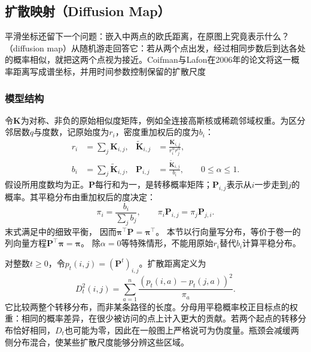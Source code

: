 \subsection{扩散映射（Diffusion Map）}
\label{sec:dim-diffusion}

平滑坐标还留下一个问题：嵌入中两点的欧氏距离，在原图上究竟表示什么？（diffusion map）从随机游走回答它：若从两个点出发，经过相同步数后到达各处的概率相似，就把这两个点视为接近。Coifman与Lafon在2006年的论文将这一概率距离写成谱坐标，并用时间参数控制保留的扩散尺度

\subsubsection{模型结构}

令$\bm{K}$为对称、非负的原始相似度矩阵，例如全连接高斯核或稀疏邻域权重。为区分邻居数$q$与度数，记原始度为$r_i$，密度重加权后的度为$b_i$：
\begin{equation}
  \label{eq:dim-diffusion-normalization}
  \begin{aligned}
    r_i&=\sum_j\bm{K}_{i,j},&
    \widetilde{\bm{K}}_{i,j}
      &=\frac{\bm{K}_{i,j}}{r_i^\alpha r_j^\alpha},\\
    b_i&=\sum_j\widetilde{\bm{K}}_{i,j},&
    \bm{P}_{i,j}&=\frac{\widetilde{\bm{K}}_{i,j}}{b_i},
    \qquad 0\leq\alpha\leq1.
  \end{aligned}
\end{equation}
假设所用度数均为正。$\bm{P}$每行和为一，是转移概率矩阵；$\bm{P}_{i,j}$表示从$i$一步走到$j$的概率。其平稳分布由重加权后的度决定：
\begin{equation}
  \label{eq:dim-diffusion-stationary}
  \pi_i=\frac{b_i}{\sum_j b_j},
  \qquad
  \pi_i\bm{P}_{i,j}=\pi_j\bm{P}_{j,i}.
\end{equation}
末式满足中的细致平衡，
因而$\bm{\pi}^{\top}\bm{P}=\bm{\pi}^{\top}$。
本节以行向量写分布，等价于卷一的列向量方程$\bm P^\top\bm\pi=\bm\pi$。
除$\alpha=0$等特殊情形，不能用原始$r_i$替代$b_i$计算平稳分布。

对整数$t\geq0$，令$p_t(i,j)=(\bm{P}^t)_{i,j}$。扩散距离定义为
\begin{equation}
  \label{eq:dim-diffusion-distance}
  D_t^2(i,j)
  =\sum_{a=1}^n\frac{(p_t(i,a)-p_t(j,a))^2}{\pi_a}.
\end{equation}
它比较两整个转移分布，而非某条路径的长度。分母用平稳概率校正目标点的权重：相同的概率差异，在很少被访问的点上计入更大的贡献。若两个起点的转移分布恰好相同，$D_t$也可能为零，因此在一般图上严格说可为伪度量。瓶颈会减缓两侧分布混合，使某些扩散尺度能够分辨这些区域。


